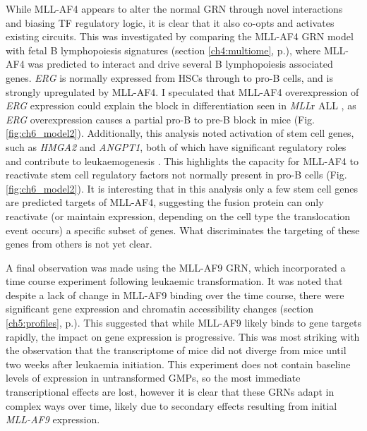 While MLL-AF4 appears to alter the normal GRN through novel interactions and biasing TF regulatory logic, it is clear that it also co-opts and activates existing circuits. This was investigated by comparing the MLL-AF4 GRN model with fetal B lymphopoiesis signatures (section \ref{ch4:multiome}, p.\pageref{ch4:multiome}), where MLL-AF4 was predicted to interact and drive several B lymphopoiesis associated genes. \textit{ERG} is normally expressed from HSCs through to pro-B cells, and is strongly upregulated by MLL-AF4. I speculated that MLL-AF4 overexpression of \textit{ERG} expression could explain the block in differentiation seen in \textit{MLL}r ALL \citep{lin_instructive_2016}, as \textit{ERG} overexpression causes a partial pro-B to pre-B block in mice \citep{tsuzuki_promotion_2011} (Fig. \ref{fig:ch6_model2}). Additionally, this analysis noted activation of stem cell genes, such as \textit{HMGA2} and \textit{ANGPT1}, both of which have significant regulatory roles and contribute to leukaemogenesis \citep{eguchi-ishimae_hmga2_2014, guenther_aberrant_2008, zhou_hematopoietic_2015}. This highlights the capacity for MLL-AF4 to reactivate stem cell regulatory factors not normally present in pro-B cells (Fig. \ref{fig:ch6_model2}). It is interesting that in this analysis only a few stem cell genes are predicted targets of MLL-AF4, suggesting the fusion protein can only reactivate (or maintain expression, depending on the cell type the translocation event occurs) a specific subset of genes. What discriminates the targeting of these genes from others is not yet clear.

A final observation was made using the MLL-AF9 GRN, which incorporated a time course experiment following leukaemic transformation. It was noted that despite a lack of change in MLL-AF9 binding over the time course, there were significant gene expression and chromatin accessibility changes (section \ref{ch5:profiles}, p.\pageref{ch5:profiles}). This suggested that while MLL-AF9 likely binds to gene targets rapidly, the impact on gene expression is progressive. This was most striking with the observation that the transcriptome of \mybmre{} mice did not diverge from \mybwt{} mice until two weeks after leukaemia initiation. This experiment does not contain baseline levels of expression in untransformed GMPs, so the most immediate transcriptional effects are lost, however it is clear that these GRNs adapt in complex ways over time, likely due to secondary effects resulting from initial \textit{MLL-AF9} expression. 

